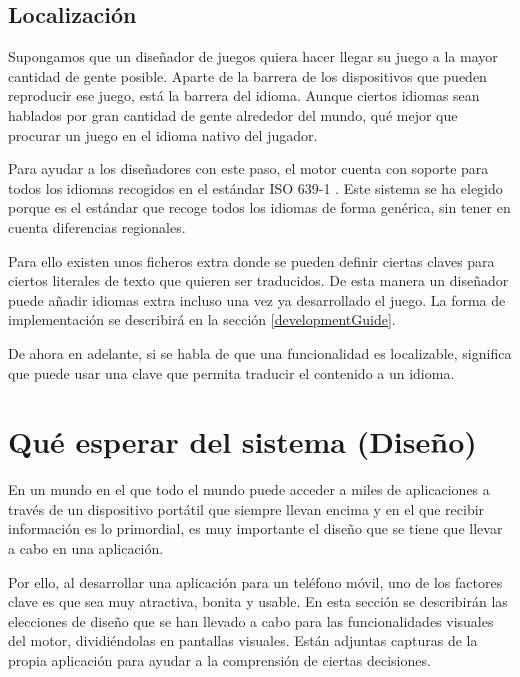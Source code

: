 \subsection{Localización}
Supongamos que un diseñador de juegos quiera hacer llegar su juego a la mayor cantidad de gente posible. Aparte de la barrera de los dispositivos que pueden reproducir ese juego, está la barrera del idioma. Aunque ciertos idiomas sean hablados por gran cantidad de gente alrededor del mundo, qué mejor que procurar un juego en el idioma nativo del jugador.

Para ayudar a los diseñadores con este paso, el motor cuenta con soporte para todos los idiomas recogidos en el estándar ISO 639-1 \cite{iso639-1Codes}. Este sistema se ha elegido porque es el estándar que recoge todos los idiomas de forma genérica, sin tener en cuenta diferencias regionales. 

Para ello existen unos ficheros extra donde se pueden definir ciertas claves para ciertos literales de texto que quieren ser traducidos. De esta manera un diseñador puede añadir idiomas extra incluso una vez ya desarrollado el juego. La forma de implementación se describirá en la sección \ref{developmentGuide}.

De ahora en adelante, si se habla de que una funcionalidad es localizable, significa que puede usar una clave que permita traducir el contenido a un idioma.

\newpage
 
\section{Qué esperar del sistema (Diseño)} \label{designSection}
En un mundo en el que todo el mundo puede acceder a miles de aplicaciones a través de un dispositivo portátil que siempre llevan encima y en el que recibir información es lo primordial, es muy importante el diseño que se tiene que llevar a cabo en una aplicación.

Por ello, al desarrollar una aplicación para un teléfono móvil, uno de los factores clave es que sea muy atractiva, bonita y usable.
En esta sección se describirán las elecciones de diseño que se han llevado a cabo para las funcionalidades visuales del motor, dividiéndolas en pantallas visuales. Están adjuntas capturas de la propia aplicación para ayudar a la comprensión de ciertas decisiones.

